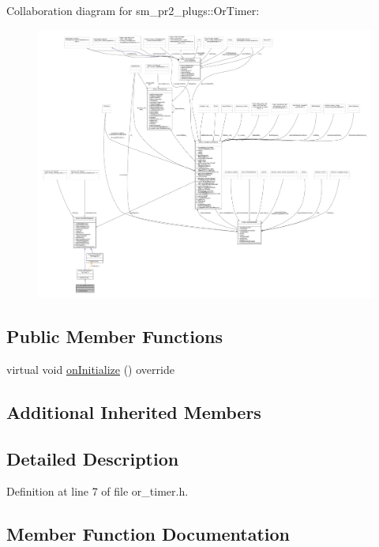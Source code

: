 Collaboration diagram for sm\+\_\+pr2\+\_\+plugs\+:\+:Or\+Timer\+:
\nopagebreak
\begin{figure}[H]
\begin{center}
\leavevmode
\includegraphics[width=350pt]{classsm__pr2__plugs_1_1OrTimer__coll__graph}
\end{center}
\end{figure}
\subsection*{Public Member Functions}
\begin{DoxyCompactItemize}
\item 
virtual void \hyperlink{classsm__pr2__plugs_1_1OrTimer_a261938a89cf08744103332ffb0ee2976}{on\+Initialize} () override
\end{DoxyCompactItemize}
\subsection*{Additional Inherited Members}


\subsection{Detailed Description}


Definition at line 7 of file or\+\_\+timer.\+h.



\subsection{Member Function Documentation}
\mbox{\label{classsm__pr2__plugs_1_1OrTimer_a261938a89cf08744103332ffb0ee2976}} 
